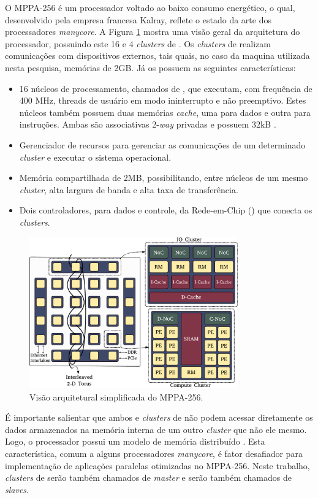\documentclass[a4paper,11pt]{article}
\newcommand{\mppa}{MPPA-256\xspace}
\newcommand{\manycore}{\textit{manycore}\xspace}
\begin{document}
O \mppa é um processador voltado ao baixo consumo energético, o qual, desenvolvido pela empresa francesa Kalray, reflete o estado da arte dos processadores \manycore. A Figura \ref{fig:mppaOverview} mostra uma visão geral da arquitetura do processador, possuindo este 16 \ccs e 4 \textit{clusters} de \io. 	Os \textit{clusters} de \io realizam comunicações com dispositivos externos, tais quais, no caso da maquina utilizada nesta pesquisa, memórias \lpddr de 2GB. Já os \ccs possuem as seguintes características:
\begin{itemize}
	\item 16 núcleos de processamento, chamados de \pes, que executam, com frequência de 400 MHz, threads de usuário em modo ininterrupto e não preemptivo. Estes núcleos também possuem duas memórias \textit{cache}, uma para dados e outra para instruções. Ambas são associativas 2-\textit{way} privadas	e possuem 32kB \cite{Podesta2018}.
	\item Gerenciador de recursos para gerenciar as comunicações de um determinado \textit{cluster} e executar o sistema operacional.
	\item Memória compartilhada de 2MB, possibilitando, entre núcleos de um mesmo \textit{cluster}, alta largura de banda e alta taxa de transferência.
	\item Dois controladores, para dados e controle, da Rede-em-Chip (\noc) que conecta os \textit{clusters}.
\end{itemize}

\begin{figure}[t]
\centering
\includegraphics[width=9cm, keepaspectratio]{figs/mppa-overview.pdf}
\caption{Visão arquitetural simplificada do \mppa \cite{Penna2018}.}\par
\label{fig:mppaOverview}
\end{figure}

É importante salientar que ambos \ccs e \textit{clusters} de \io não podem acessar diretamente os dados armazenados na memória interna de um outro \textit{cluster} que não ele mesmo. Logo, o processador possui um modelo de memória distribuído \cite{Castro-Souza-CCPE:2016, Podesta2018}. Esta característica, comum a alguns processadores \manycore, é fator desafiador para implementação de aplicações paralelas otimizadas no \mppa \cite{Castro-IA3-JPDC:2014}. Neste trabalho, \textit{clusters} de \io serão também chamados de \textit{master} e \ccs serão também chamados de \textit{slaves}.
\end{document}
